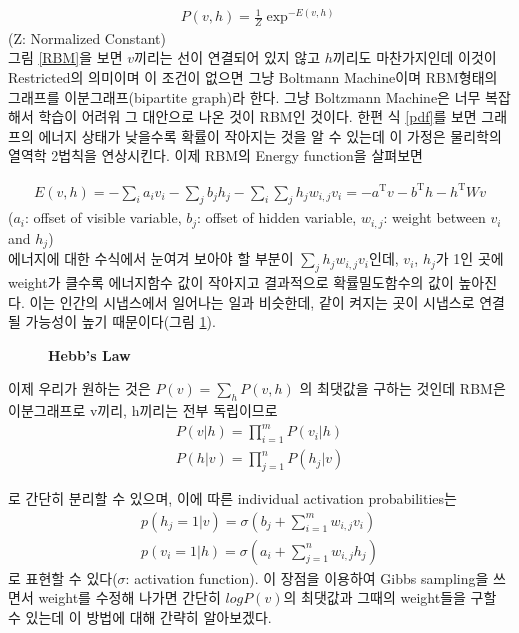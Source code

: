 \documentclass[10pt]{article}
\begin{document}
\begin{align}\label{pdf}
P(v,h)=\frac{1}{Z}\exp^{-E(v,h)}
\end{align}
(Z: Normalized Constant)\\

그림 \ref{RBM}을 보면 $v$끼리는 선이 연결되어 있지 않고 $h$끼리도 마찬가지인데 이것이 Restricted의 의미이며 이 조건이 없으면 그냥 Boltmann Machine이며 RBM형태의 그래프를 이분그래프(bipartite graph)라 한다. 그냥 Boltzmann Machine은 너무 복잡해서 학습이 어려워 그 대안으로 나온 것이 RBM인 것이다. 한편 식 \ref{pdf}를 보면 그래프의 에너지 상태가 낮을수록 확률이 작아지는 것을 알 수 있는데 이 가정은 물리학의 열역학 2법칙을 연상시킨다. 이제 RBM의 Energy function을 살펴보면 

\begin{align}\label{energy}
E(v,h)= -\sum_i a_i v_i - \sum_j b_j h_j -\sum_i \sum_j h_j w_{i,j} v_i=-a^{\mathrm{T}} v - b^{\mathrm{T}} h -h^{\mathrm{T}} W v
\end{align}
($a_i$: offset of visible variable, $b_j$: offset of hidden variable, $w_{i,j}$: weight between $v_i$ and $h_j$)\\
에너지에 대한 수식에서 눈여겨 보아야 할 부분이 $\sum_j h_j w_{i,j} v_i$인데, $v_i$, $h_j$가 1인 곳에 weight가 클수록 에너지함수 값이 작아지고 결과적으로 확률밀도함수의 값이 높아진다. 이는 인간의 시냅스에서 일어나는 일과 비슷한데, 같이 켜지는 곳이 시냅스로 연결될 가능성이 높기 때문이다(그림 \ref{Hebb}).

\begin{figure}[!ht]
\centering
{} 
\caption{\bf{Hebb's Law}\cite{hebb2,kimjunmoppt}}
\label{Hebb}
\end{figure}


이제 우리가 원하는 것은 $P(v)=\sum_h P(v,h)$ 의 최댓값을 구하는 것인데 RBM은 이분그래프로 v끼리, h끼리는 전부 독립이므로 
\begin{subequations}
 \label{RBMcondition}
 \begin{align}
  P(v|h) = \prod_{i=1}^m P(v_i|h) \label{eq11} \\
  P(h|v) = \prod_{j=1}^n P(h_j|v) \label{eq12}
 \end{align}
\end{subequations}


로 간단히 분리할 수 있으며, 이에 따른 individual activation probabilities는 
\begin{subequations}
 \label{RBMindi}
 \begin{align}
  p(h_j=1|v) = \sigma \left(b_j + \sum_{i=1}^m w_{i,j} v_i \right) \label{eq13} \\
  p(v_i=1|h) = \sigma \left(a_i + \sum_{j=1}^n w_{i,j} h_j \right) \label{eq14}
 \end{align}
\end{subequations}
로 표현할 수 있다($\sigma$: activation function). 이 장점을 이용하여 Gibbs sampling을 쓰면서 weight를 수정해 나가면  간단히 $logP(v)$의 최댓값과 그때의 weight들을 구할 수 있는데 이 방법에 대해 간략히 알아보겠다. 
\end{document}
